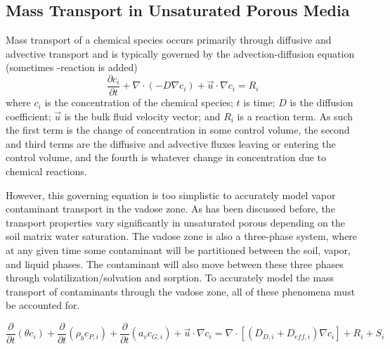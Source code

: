 \subsection{Mass Transport in Unsaturated Porous Media}\label{sec:mass_transport}

Mass transport of a chemical species occurs primarily through diffusive and advective transport and is typically governed by the advection-diffusion equation (sometimes -reaction is added)
\begin{equation}
  \frac{\partial c_i}{\partial t} + \nabla \cdot (-D \nabla c_i) + \vec{u} \cdot \nabla c_i = R_i
\end{equation}
where $c_i$ is the concentration of the chemical species; $t$ is time; $D$ is the diffusion coefficient; $\vec{u}$ is the bulk fluid velocity vector; and $R_i$ is a reaction term.
As such the first term is the change of concentration in some control volume, the second and third terms are the diffusive and advective fluxes leaving or entering the control volume, and the fourth is whatever change in concentration due to chemical reactions.\par

However, this governing equation is too simplistic to accurately model vapor contaminant transport in the vadose zone.
As has been discussed before, the transport properties vary significantly in unsaturated porous depending on the soil matrix water saturation.
The vadose zone is also a three-phase system, where at any given time some contaminant will be partitioned between the soil, vapor, and liquid phases.
The contaminant will also move between these three phases through volatilization/solvation and sorption.
To accurately model the mass transport of contaminants through the vadose zone, all of these phenomena must be accounted for.\par

\begin{equation}
  \frac{\partial}{\partial t} (\theta c_i) +
  \frac{\partial}{\partial t} (\rho_b c_{P,i}) +
  \frac{\partial}{\partial t} (a_v c_{G,i}) +
  \vec{u} \cdot \nabla c_i =
  \nabla \cdot [(D_{D,i} + D_{eff,i}) \nabla c_i] +
  R_i + S_i
\end{equation}
